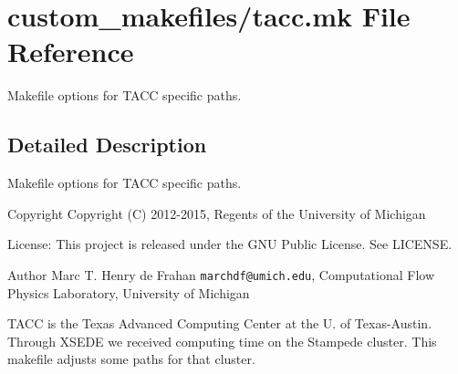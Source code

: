 \section{custom\-\_\-makefiles/tacc.mk File Reference}
\label{tacc_8mk}


Makefile options for T\-A\-C\-C specific paths.  




\subsection{Detailed Description}
Makefile options for T\-A\-C\-C specific paths. \begin{DoxyCopyright}{Copyright}
Copyright (C) 2012-\/2015, Regents of the University of Michigan 
\end{DoxyCopyright}
\begin{DoxyParagraph}{License\-:}
This project is released under the G\-N\-U Public License. See L\-I\-C\-E\-N\-S\-E. 
\end{DoxyParagraph}
\begin{DoxyAuthor}{Author}
Marc T. Henry de Frahan {\tt marchdf@umich.\-edu}, Computational Flow Physics Laboratory, University of Michigan
\end{DoxyAuthor}
T\-A\-C\-C is the Texas Advanced Computing Center at the U. of Texas-\/\-Austin. Through X\-S\-E\-D\-E we received computing time on the Stampede cluster. This makefile adjusts some paths for that cluster. 